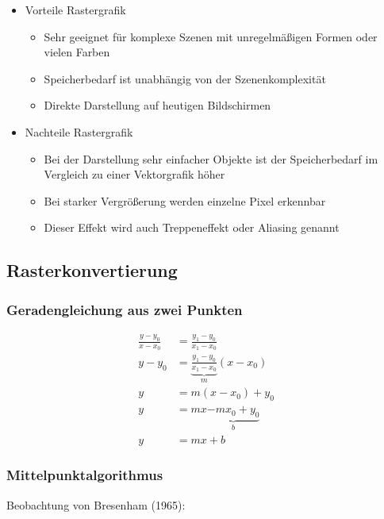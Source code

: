 \documentclass{scrartcl}
\begin{document}
\begin{itemize}
	\item Vorteile Rastergrafik
	\begin{itemize}
		\item Sehr geeignet für komplexe Szenen mit unregelmäßigen Formen oder vielen Farben
		\item Speicherbedarf ist unabhängig von der Szenenkomplexität
		\item Direkte Darstellung auf heutigen Bildschirmen
	\end{itemize}
	\item Nachteile Rastergrafik
	\begin{itemize}
		\item Bei der Darstellung sehr einfacher Objekte ist der Speicherbedarf im Vergleich zu einer Vektorgrafik höher
		\item Bei starker Vergrößerung werden einzelne Pixel erkennbar
		\item Dieser Effekt wird auch Treppeneffekt oder Aliasing genannt
	\end{itemize}
\end{itemize}

\subsection{Rasterkonvertierung}

\subsubsection{Geradengleichung aus zwei Punkten}

\begin{equation}
	\begin{split}
	\frac{y - y_0}{x - x_0} &= \frac{y_1 - y_0}{x_1 - x_0} \\
	y - y_0 &= \underbrace{\frac{y_1 - y_0}{x_1 -x_0}}_m (x - x_0) \\
	y &= m(x- x_0) + y_0 \\
	y &= mx \underbrace{-mx_0 + y_0}_b \\
	y &= mx + b
	\end{split}
\end{equation}

\subsubsection{Mittelpunktalgorithmus}

Beobachtung von Bresenham (1965): \\
\end{document}
